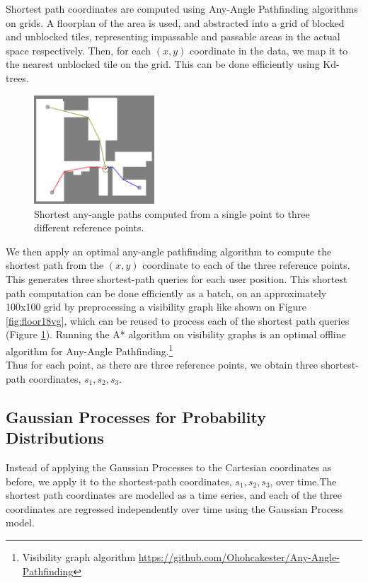 \documentclass[letterpaper]{article}
\begin{document}
Shortest path coordinates are computed using Any-Angle Pathfinding algorithms on grids. A floorplan of the area is used, and abstracted into a grid of blocked and unblocked tiles, representing impassable and passable areas in the actual space respectively. Then, for each $(x,y)$ coordinate in the data, we map it to the nearest unblocked tile on the grid. This can be done efficiently using Kd-trees.\\

\begin{figure}[!h]
  \centering
    \includegraphics[width=170px]{diagrams/floor18shortestpaths.png}
  \caption{Shortest any-angle paths computed from a single point to three different reference points.}
  \label{fig:floor18sps}
\end{figure}

We then apply an optimal any-angle pathfinding algorithm to compute the shortest path from the $(x,y)$ coordinate to each of the three reference points. This generates three shortest-path queries for each user position. This shortest path computation can be done efficiently as a batch, on an approximately 100x100 grid by preprocessing a visibility graph like shown on Figure \ref{fig:floor18vg}, which can be reused to process each of the shortest path queries (Figure \ref{fig:floor18sps}). Running the A* algorithm on visibility graphs is an optimal offline algorithm for Any-Angle Pathfinding.\footnote{Visibility graph algorithm \url{https://github.com/Ohohcakester/Any-Angle-Pathfinding}}\\

Thus for each point, as there are three reference points, we obtain three shortest-path coordinates, $s_1, s_2, s_3$.

\subsection{Gaussian Processes for Probability Distributions}

Instead of applying the Gaussian Processes to the Cartesian coordinates as before, we apply it to the shortest-path coordinates, $s_1, s_2, s_3$, over time.The shortest path coordinates are modelled as a time series, and each of the three coordinates are regressed independently over time using the Gaussian Process model.\\
\end{document}
